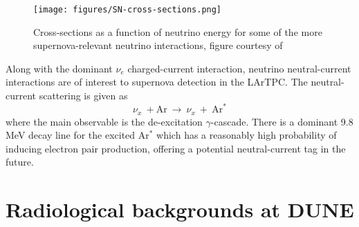 \begin{figure}[h] %
   \centering
   \texttt{[image: figures/SN-cross-sections.png]} 
   \caption{Cross-sections as a function of neutrino energy for some of the more supernova-relevant neutrino interactions, figure courtesy of \cite{gil2003oscillation}}
   \label{fig:SN-cross-sections}
\end{figure}

\noindent Along with the dominant $\nu_{e}$ charged-current interaction, neutrino neutral-current interactions are of interest to supernova detection in the LArTPC.
The neutral-current scattering is given as
\begin{equation}
\nu_{x}\ + \textrm{Ar}\ \rightarrow\ \nu_{x}\ +\ \textrm{Ar}^{*}
\end{equation}
\noindent where the main observable is the de-excitation $\gamma$-cascade.
There is a dominant 9.8 MeV decay line for the excited Ar$^{*}$ which has a reasonably high probability of inducing electron pair production, offering a potential neutral-current tag in the future.

\section{Radiological backgrounds at DUNE}




























